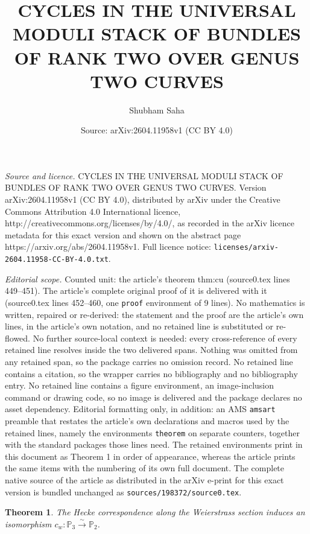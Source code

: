 \documentclass[10pt,a4paper]{amsart}
\title{\MakeUppercase{Cycles in the universal moduli stack of bundles of rank two over genus two curves}}
\author{Shubham Saha}
\date{Source: arXiv:2604.11958v1 (CC BY 4.0)}
\newtheorem{theorem}{Theorem}
\newcommand{\p}{\mathbb{P}}
\begin{document}
\maketitle

\noindent\emph{Source and licence.} \MakeUppercase{Cycles in the universal moduli stack of bundles of rank two over genus two curves}. Version arXiv:2604.11958v1 (CC BY 4.0), distributed by arXiv under the Creative Commons Attribution 4.0 International licence, http://creativecommons.org/licenses/by/4.0/, as recorded in the arXiv licence metadata for this exact version and shown on the abstract page https://arxiv.org/abs/2604.11958v1. Full licence notice: \texttt{licenses/arxiv-2604.11958-CC-BY-4.0.txt}.\par\smallskip

\noindent\textit{Editorial scope.} Counted unit: the article's theorem thm:cu (source0.tex lines 449--451). The article's complete original proof of it is delivered with it (source0.tex lines 452--460, one \texttt{proof} environment of 9 lines). No mathematics is written, repaired or re-derived: the statement and the proof are the article's own lines, in the article's own notation, and no retained line is substituted or re-flowed.  No further source-local context is needed: every cross-reference of every retained line resolves inside the two delivered spans.  Nothing was omitted from any retained span, so the package carries no omission record.  No retained line contains a citation, so the wrapper carries no bibliography and no bibliography entry.  No retained line contains a figure environment, an image-inclusion command or drawing code, so no image is delivered and the package declares no asset dependency.  Editorial formatting only, in addition: an AMS \texttt{amsart} preamble that restates the article's own declarations and macros used by the retained lines, namely the environments \texttt{theorem} on separate counters, together with the standard packages those lines need.  The retained environments print in this document as Theorem 1 in order of appearance, whereas the article prints the same items with the numbering of its own full document.  The complete native source of the article as distributed in the arXiv e-print for this exact version is bundled unchanged as \texttt{sources/198372/source0.tex}.
\begin{theorem}\label{thm:cu}
The Hecke correspondence along the Weierstrass section induces an isomorphism $c_w:\p_{3}\xrightarrow{\sim} \p_{2}$.
\end{theorem}
\end{document}
